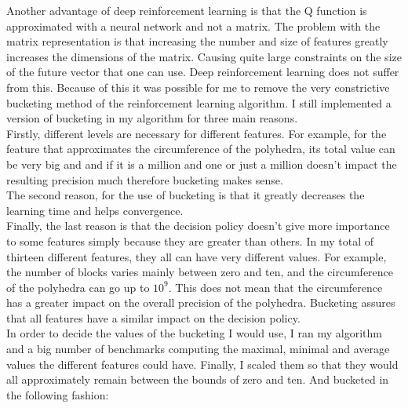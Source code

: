 Another advantage of deep reinforcement learning is that the Q function is approximated with a neural network and not a matrix. The problem with the matrix representation is that increasing the number and size of features greatly increases the dimensions of the matrix. Causing quite large constraints on the size of the future vector that one can use. Deep reinforcement learning does not suffer from this. Because of this it was possible for me to remove the very constrictive bucketing method of the reinforcement learning algorithm. I still implemented a version of bucketing in my algorithm for three main reasons. \\
Firstly, different levels are necessary for different features. For example, for the feature that approximates the circumference of the polyhedra, its total value can be very big and and if it is a million and one or just a million doesn't impact the resulting precision much therefore bucketing makes sense. \\
The second reason, for the use of bucketing is that it greatly decreases the learning time and helps convergence. \\
Finally, the last reason is that the decision policy doesn't give more importance to some features simply because they are greater than others. In my total of thirteen different features, they all can have very different values. For example, the number of blocks varies mainly between zero and ten, and the circumference of the polyhedra can go up to $10^9$. This does not mean that the circumference has a greater impact on the overall precision of the polyhedra. Bucketing assures that all features have a similar impact on the decision policy.\\
In order to decide the values of the bucketing I would use, I ran my algorithm and a big number of benchmarks computing the maximal, minimal and average values the different features could have. Finally, I scaled them so that they would all approximately remain between the bounds of zero and ten. And bucketed in the following fashion:
